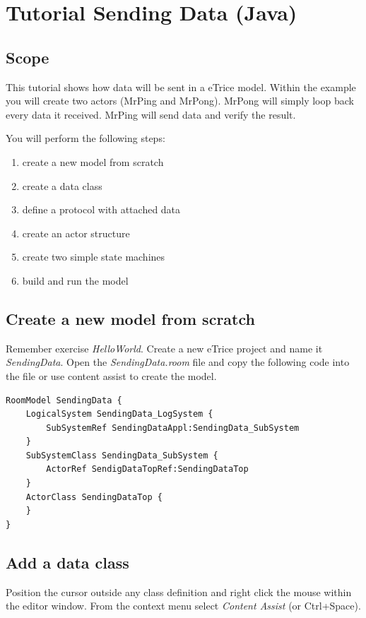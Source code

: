 \chapter{Tutorial Sending Data (Java)}

\section{Scope}

This tutorial shows how data will be sent in a eTrice model. Within the example you will create two actors 
(MrPing and MrPong). MrPong will simply loop back every data it received.
MrPing will send data and verify the result.   

You will perform the following steps:

\begin{enumerate}
\item create a new model from scratch
\item create a data class
\item define a protocol with attached data
\item create an actor structure
\item create two simple state machines
\item build and run the model
\end{enumerate}

\section{Create a new model from scratch}

Remember exercise \textit{HelloWorld}.
Create a new eTrice project and name it \textit{SendingData}.
Open the \textit{SendingData.room} file and copy the following code into the file or use content assist to 
create the model.


\begin{verbatim} 
RoomModel SendingData {
    LogicalSystem SendingData_LogSystem {
        SubSystemRef SendingDataAppl:SendingData_SubSystem 
    }
    SubSystemClass SendingData_SubSystem {
        ActorRef SendigDataTopRef:SendingDataTop 
    }
    ActorClass SendingDataTop {
    }
}
\end{verbatim}

\section{Add a data class}

Position the cursor outside any class definition and right click the mouse within the editor window. From 
the context menu select \textit{Content Assist} (or Ctrl+Space).  


